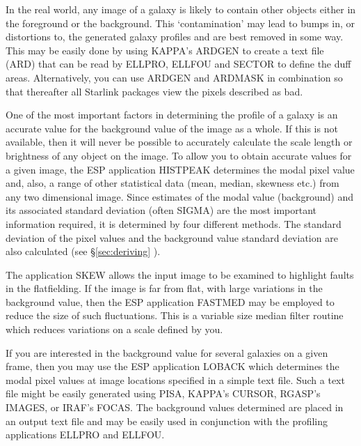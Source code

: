 \documentclass[twoside,11pt]{article}
\newcommand{\xref}[3]{#1}
\begin{document}
In the real world, any image of a galaxy is likely to contain other 
objects either in the foreground or the background. This `contamination'
may lead to bumps in, or distortions to, the generated galaxy profiles and
are best removed in some way. This may be easily done by 
using \xref{KAPPA}{sun95}{}'s ARDGEN to create a text file (ARD) that can be read by 
ELLPRO, ELLFOU and SECTOR to define the duff areas. Alternatively, you can 
use ARDGEN and ARDMASK in combination so that thereafter all Starlink
packages view the pixels described as bad.

One of the most important factors in determining the profile of a
galaxy is an accurate value for the background value of the image as a
whole.  If this is not available, then it will never be possible to
accurately calculate the scale length or brightness of any object on
the image.  To allow you to obtain accurate values for a given image,
the ESP application HISTPEAK determines the modal pixel value and,
also, a range of other statistical data (mean, median, skewness etc.)
from any two dimensional image. Since estimates of the modal value
(background) and its associated standard deviation (often SIGMA) are the most
important information required, it is determined by four different
methods. The standard deviation of the pixel values and the background
value standard deviation are also calculated (see \S\ref{sec:deriving} ).

The application SKEW allows the input image to be examined to highlight
faults in the flatfielding.  If the image is far from flat, with large
variations in the background value, then the ESP application FASTMED
may be employed to reduce the size of such fluctuations. This is a
variable size median filter routine which reduces variations on a scale
defined by you.

If you are interested in the background value for several galaxies on a
given frame, then you may use the ESP application LOBACK which
determines the modal pixel values at image locations specified in a
simple text file. Such a text file might be easily generated using
\xref{PISA}{sun109}{}, \xref{KAPPA}{sun95}{}'s CURSOR, RGASP's IMAGES, or 
\xref{IRAF}{sun179}{}'s 
FOCAS. The background
values determined are placed in an output text file and may be easily
used in conjunction with the profiling applications ELLPRO and ELLFOU.
\end{document}
